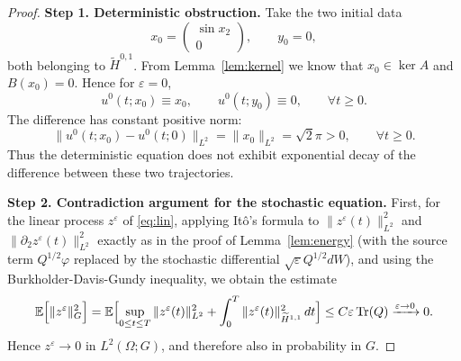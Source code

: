 \documentclass[11pt,a4paper,reqno]{amsart}
\theoremstyle{definition}
\begin{document}
\begin{proof}
  \noindent\textbf{Step 1. Deterministic obstruction.}
  Take the two initial data
  \[
    x_0 = \begin{pmatrix} \sin x_2 \\ 0 \end{pmatrix}, \qquad y_0 = 0,
  \]
  both belonging to $\widetilde H^{0,1}$.  From Lemma~\ref{lem:kernel} we know
  that $x_0\in\ker A$ and $B(x_0)=0$.  Hence for $\varepsilon=0$,
  \[
    u^0(t;x_0) \equiv x_0,\qquad u^0(t;y_0) \equiv 0,\qquad \forall t\ge 0 .
  \]
  The difference has constant positive norm:
  \[
    \|u^0(t;x_0) - u^0(t;0)\|_{L^2} = \|x_0\|_{L^2} = \sqrt{2}\pi > 0,
    \qquad \forall t\ge 0 .
  \]
  Thus the deterministic equation does not exhibit exponential decay of
  the difference between these two trajectories.

  \medskip
\noindent\textbf{Step 2. Contradiction argument for the stochastic equation.}
First, for the linear process $z^\varepsilon$ of
\eqref{eq:lin}, applying It\^o's formula to $\|z^\varepsilon(t)\|_{L^2}^2$ and
$\|\partial_2 z^\varepsilon(t)\|_{L^2}^2$ exactly as in the proof of
Lemma~\ref{lem:energy} (with the source term $Q^{1/2}\varphi$ replaced by
the stochastic differential $\sqrt\varepsilon Q^{1/2}dW$), and using the
Burkholder-Davis-Gundy inequality, we obtain
the estimate
\[
  \mathbb E\Bigl[ \|z^\varepsilon\|_G^2 \Bigr]
  = \mathbb E\Bigl[ \sup_{0\le t\le T}\|z^\varepsilon(t)\|_{L^2}^2
    + \int_0^T \|z^\varepsilon(t)\|_{\widetilde H^{1,1}}^2\,dt \Bigr]
  \le C\varepsilon\,\mathrm{Tr}(Q) \xrightarrow{\varepsilon\to0} 0 .
\]
Hence $z^\varepsilon\to0$ in $L^2(\Omega;G)$, and therefore also in probability
in $G$.



\end{proof}
\end{document}
